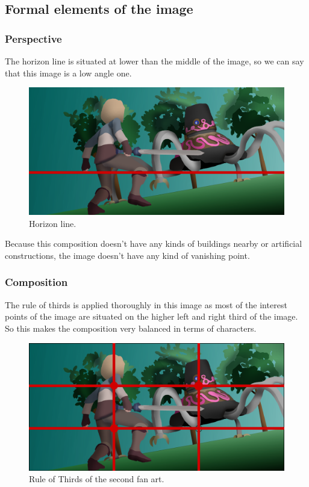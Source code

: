 \documentclass{cup-pan}
\begin{document}
\newpage
    \subsection{Formal elements of the image}
        
        \subsubsection{Perspective}

            The horizon line is situated at lower than the middle of the image, so we can say that this image is a low angle one.\\
            \begin{figure}[H]
                \includegraphics[width=\textwidth]{Imagenes/Fanart2/Analysis/horizonte.png}
                \caption{Horizon line.}
            \end{figure}

            Because this composition doesn't have any kinds of buildings nearby or artificial constructions, the image doesn't have any kind of vanishing point.\\

        \subsubsection{Composition}

            The rule of thirds is applied thoroughly in this image as most of the interest points of the image are situated on the higher left and right third of the image. So this makes the composition very balanced in terms of characters. 
            \begin{figure}[H]
                \includegraphics[width=\textwidth]{Imagenes/Fanart2/Analysis/Analysis.png}
                \caption{Rule of Thirds of the second fan art.}
            \end{figure}
\end{document}
